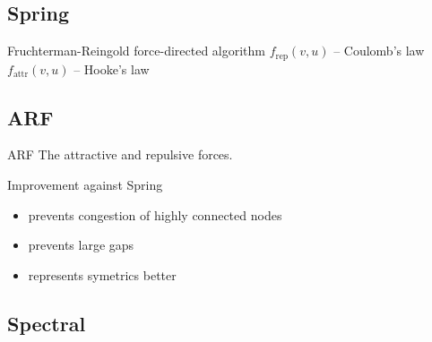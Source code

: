 \documentclass[11pt]{beamer}
\begin{document}
\subsection{Spring}
\begin{frame}{\subsecname}

    \begin{block}{Fruchterman-Reingold force-directed algorithm}
        $f_\text{rep}(v,u)$ -- Coulomb's law\\
        $f_\text{attr}(v,u)$ -- Hooke's law
    \end{block}

    \pause
    \resizebox{0.75\textwidth}{!}{}
\end{frame}

\subsection{ARF}
\begin{frame}{\subsecname}

    \begin{block}{ARF}
        The attractive and repulsive forces.
    \end{block}

    \pause
    \begin{block}{Improvement against Spring}
        \begin{itemize}
            \pause
            \item prevents congestion of highly connected nodes
            \pause
            \item prevents large gaps
            \pause
            \item represents symetrics better
        \end{itemize}
    \end{block}

\end{frame}

\begin{frame}{\subsecname}
    \resizebox{0.8\textwidth}{!}{}
\end{frame}

\subsection{Spectral}
\begin{frame}{\subsecname}
    \resizebox{0.8\textwidth}{!}{}
\end{frame}
\end{document}
